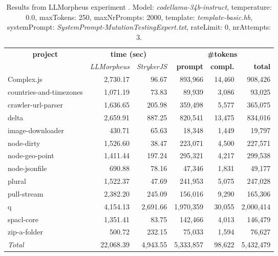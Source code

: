 
\begin{table*}[hbt!]
\centering
{\scriptsize
\begin{tabular}{l||r|r|r|r|r}
\multicolumn{1}{c|}{\bf project} & \multicolumn{2}{|c|}{\bf time (sec)} & \multicolumn{3}{|c|}{\bf \#tokens} \\
               & {\it LLMorpheus} & {\it StrykerJS} & {\bf prompt} & {\bf compl.} & {\bf total} \\
\hline
  Complex.js & 2,730.17 & 96.67 & 893,966 & 14,460 & 908,426 \\ 
countries-and-timezones & 1,071.19 & 73.83 & 89,939 & 3,086 & 93,025 \\ 
crawler-url-parser & 1,636.65 & 205.98 & 359,498 & 5,577 & 365,075 \\ 
delta & 2,659.91 & 887.25 & 820,541 & 13,475 & 834,016 \\ 
image-downloader & 430.71 & 65.63 & 18,348 & 1,449 & 19,797 \\ 
node-dirty & 1,526.60 & 38.47 & 223,071 & 4,500 & 227,571 \\ 
node-geo-point & 1,411.44 & 197.24 & 295,321 & 4,217 & 299,538 \\ 
node-jsonfile & 690.88 & 78.16 & 47,346 & 1,831 & 49,177 \\ 
plural & 1,522.37 & 47.69 & 241,953 & 5,075 & 247,028 \\ 
pull-stream & 2,382.20 & 245.09 & 156,016 & 9,290 & 165,306 \\ 
q & 4,154.13 & 2,691.66 & 1,970,359 & 30,055 & 2,000,414 \\ 
spacl-core & 1,351.41 & 83.75 & 142,466 & 4,013 & 146,479 \\ 
zip-a-folder & 500.72 & 232.15 & 75,033 & 1,594 & 76,627 \\ 
\hline
  \textit{Total} & 22,068.39 & 4,943.55 & 5,333,857 & 98,622 & 5,432,479 \\
  \end{tabular}
  }
  \\[2mm]
  \caption{Results from LLMorpheus experiment .
    Model: \textit{codellama-34b-instruct}, 
    temperature: 0.0, 
    maxTokens: 250, 
    maxNrPrompts: 2000, 
    template: \textit{template-basic.hb}, 
    systemPrompt: \textit{SystemPrompt-MutationTestingExpert.txt}, 
    rateLimit: 0, 
    nrAttempts: 3.  
  }
  \label{table:Cost:run394:codellama-34b-instruct:template-basic.hb:0.0}
\end{table*}